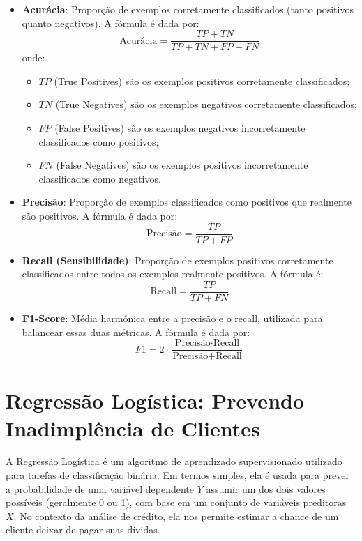 \documentclass{abntpuc}
\begin{document}
\begin{itemize}
    \item \textbf{Acurácia}: Proporção de exemplos corretamente classificados (tanto positivos quanto negativos). A fórmula é dada por:
    \[
    \text{Acurácia} = \frac{TP + TN}{TP + TN + FP + FN}
    \]
    onde:
    \begin{itemize}
        \item \(TP\) (True Positives) são os exemplos positivos corretamente classificados;
        \item \(TN\) (True Negatives) são os exemplos negativos corretamente classificados;
        \item \(FP\) (False Positives) são os exemplos negativos incorretamente classificados como positivos;
        \item \(FN\) (False Negatives) são os exemplos positivos incorretamente classificados como negativos.
    \end{itemize}

    \item \textbf{Precisão}: Proporção de exemplos classificados como positivos que realmente são positivos. A fórmula é dada por:
    \[
    \text{Precisão} = \frac{TP}{TP + FP}
    \]
    
    \item \textbf{Recall (Sensibilidade)}: Proporção de exemplos positivos corretamente classificados entre todos os exemplos realmente positivos. A fórmula é:
    \[
    \text{Recall} = \frac{TP}{TP + FN}
    \]
    
    \item \textbf{F1-Score}: Média harmônica entre a precisão e o recall, utilizada para balancear essas duas métricas. A fórmula é dada por:
    \[
    F1 = 2 \cdot \frac{\text{Precisão} \cdot \text{Recall}}{\text{Precisão} + \text{Recall}}
    \]
\end{itemize}

\chapter{Regressão Logística: Prevendo Inadimplência de Clientes}

A Regressão Logística é um algoritmo de aprendizado supervisionado utilizado para tarefas de classificação binária. Em termos simples, ela é usada para prever a probabilidade de uma variável dependente \(Y\) assumir um dos dois valores possíveis (geralmente 0 ou 1), com base em um conjunto de variáveis preditoras \(X\).
No contexto da análise de crédito, ela nos permite estimar a chance de um cliente deixar de pagar suas dívidas.
\end{document}
